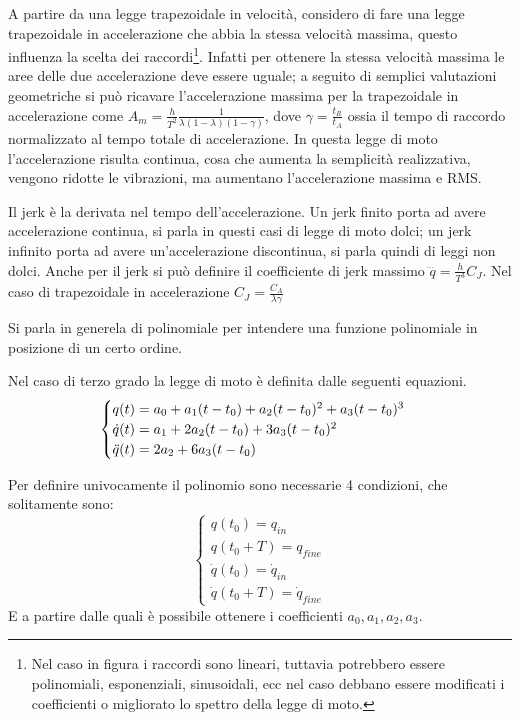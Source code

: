 A partire da una legge trapezoidale in velocità, considero di fare una legge trapezoidale in accelerazione che abbia la stessa velocità massima, questo influenza la scelta dei raccordi\footnote{Nel caso in figura i raccordi sono lineari, tuttavia potrebbero essere polinomiali, esponenziali, sinusoidali, ecc nel caso debbano essere modificati i coefficienti o migliorato lo spettro della legge di moto.}.
Infatti per ottenere la stessa velocità massima le aree delle due accelerazione deve essere uguale; a seguito di semplici valutazioni geometriche si può ricavare l'accelerazione massima per la trapezoidale in accelerazione come \(A_m=\frac{h}{T^2}\frac{1}{\lambda(1-\lambda)(1-\gamma)}\), dove \(\gamma = \frac{t_R}{t_A}\) ossia il tempo di raccordo normalizzato al tempo totale di accelerazione. 
In questa legge di moto l'accelerazione risulta continua, cosa che aumenta la semplicità realizzativa, vengono ridotte le vibrazioni, ma aumentano l'accelerazione massima e RMS.


Il jerk è la derivata nel tempo dell'accelerazione. Un jerk finito porta ad avere accelerazione continua, si parla in questi casi di legge di moto dolci; un jerk infinito porta ad avere un'accelerazione discontinua, si parla quindi di leggi non dolci.
Anche per il jerk si può definire il coefficiente di jerk massimo \(\dddot{q} = \frac{h}{T^3}C_J\).
Nel caso di trapezoidale in accelerazione \(C_J = \frac{C_A}{\lambda \gamma}\)

Si parla in generela di polinomiale per intendere una funzione polinomiale in posizione di un certo ordine.

Nel caso di terzo grado la legge di moto è definita dalle seguenti equazioni.
\[\begin{cases}
    q(t) = a_0 + a_1 (t-t_0) + a_2 (t-t_0)^2 + a_3 (t-t_0)^3 \\
    \dot{q}(t) = a_1 + 2 a_2 (t-t_0) + 3 a_3 (t-t_0)^2 \\
    \Ddot{q}(t) = 2 a_2 + 6 a_3 (t-t_0)
\end{cases}\]

Per definire univocamente il polinomio sono necessarie 4 condizioni, che solitamente sono:
\[\begin{cases}
    q(t_0) = q_{in}  \\
    q(t_0+T) = q_{fine}  \\
    \dot{q}(t_0) = \dot{q}_{in}  \\
    \dot{q}(t_0+T) = \dot{q}_{fine}  
\end{cases}\]
E a partire dalle quali è possibile ottenere i coefficienti \(a_0,a_1,a_2,a_3\).

